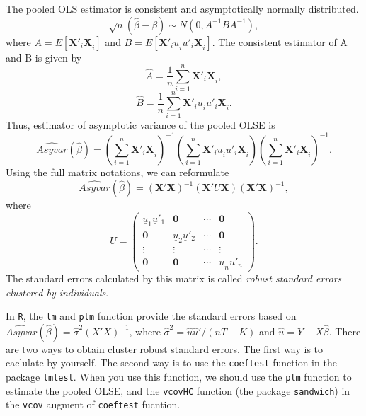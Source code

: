 \documentclass[
  12pt,
]{article}
\begin{document}
The pooled OLS estimator is consistent and asymptotically normally
distributed. \[
  \sqrt{n}(\hat{\beta} - \beta) \sim N(0, A^{-1} B A^{-1}),
\] where \(A = E[\underline{\mathbf{X}}'_i\underline{\mathbf{X}}_i]\)
and
\(B = E[\underline{\mathbf{X}}'_i \underline{u}_i \underline{u}'_i \underline{\mathbf{X}}_i]\).
The consistent estimator of A and B is given by \[
  \hat{A} = \frac{1}{n} \sum_{i=1}^n \underline{\mathbf{X}}'_i\underline{\mathbf{X}}_i,
\] \[
  \hat{B} = \frac{1}{n} \sum_{i=1}^n \underline{\mathbf{X}}'_i \underline{u}_i \underline{u}'_i \underline{\mathbf{X}}_i.
\] Thus, estimator of asymptotic variance of the pooled OLSE is \[
  \hat{Asyvar}(\hat{\beta}) =
  \left( \sum_{i=1}^n \underline{\mathbf{X}}'_i\underline{\mathbf{X}}_i \right)^{-1}
  \left( \sum_{i=1}^n \underline{\mathbf{X}}'_i \underline{u}_i \underline{u}'_i \underline{\mathbf{X}}_i \right)
  \left( \sum_{i=1}^n \underline{\mathbf{X}}'_i\underline{\mathbf{X}}_i \right)^{-1}.
\] Using the full matrix notations, we can reformulate \[
  \hat{Asyvar}(\hat{\beta}) =
  (\mathbf{X}' \mathbf{X})^{-1}
  (\mathbf{X}' U \mathbf{X})
  (\mathbf{X}' \mathbf{X})^{-1},
\] where \[
  U = 
  \begin{pmatrix}
    \underline{u}_1 \underline{u}'_1 & \mathbf{0} & \cdots & \mathbf{0} \\
    \mathbf{0} & \underline{u}_2 \underline{u}'_2 & \cdots & \mathbf{0} \\
    \vdots & \vdots & \cdots & \vdots \\
    \mathbf{0} & \mathbf{0} & \cdots & \underline{u}_n \underline{u}'_n
  \end{pmatrix}.
\] The standard errors calculated by this matrix is called \emph{robust
standard errors clustered by individuals}.

In \texttt{R}, the \texttt{lm} and \texttt{plm} function provide the
standard errors based on
\(\hat{Asyvar}(\hat{\beta}) = \hat{\sigma}^2 (X'X)^{-1}\), where
\(\hat{\sigma}^2 = \hat{u}\hat{u}'/(nT - K)\) and
\(\hat{u} = Y - X \hat{\beta}\). There are two ways to obtain cluster
robust standard errors. The first way is to caclulate by yourself. The
second way is to use the \texttt{coeftest} function in the package
\texttt{lmtest}. When you use this function, we should use the
\texttt{plm} function to estimate the pooled OLSE, and the
\texttt{vcovHC} function (the package \texttt{sandwich}) in the
\texttt{vcov} augment of \texttt{coeftest} fucntion.
\end{document}

